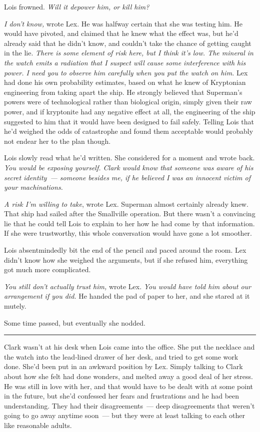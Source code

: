 \documentclass[ebook,12pt]{memoir}
\begin{document}
Lois frowned. \emph{Will it depower him, or kill him?}

\emph{I don't know,} wrote Lex. He was halfway certain that she was
testing him. He would have pivoted, and claimed that he knew what the
effect was, but he'd already said that he didn't know, and couldn't take
the chance of getting caught in the lie. \emph{There is some element of
risk here, but I think it's low. The mineral in the watch emits a
radiation that I suspect will cause some interference with his power. I
need you to observe him carefully when you put the watch on him.} Lex
had done his own probability estimates, based on what he knew of
Kryptonian engineering from taking apart the ship. He strongly believed
that Superman's powers were of technological rather than biological
origin, simply given their raw power, and if kryptonite had any negative
effect at all, the engineering of the ship suggested to him that it
would have been designed to fail safely. Telling Lois that he'd weighed
the odds of catastrophe and found them acceptable would probably not
endear her to the plan though.

Lois slowly read what he'd written. She considered for a moment and
wrote back. \emph{You would be exposing yourself. Clark would know that
someone was aware of his secret identity~--- someone besides me, if he
believed I was an innocent victim of your machinations.}

\emph{A risk I'm willing to take}, wrote Lex. Superman almost certainly
already knew. That ship had sailed after the Smallville operation. But
there wasn't a convincing lie that he could tell Lois to explain to her
how he had come by that information. If she were trustworthy, this whole
conversation would have gone a lot smoother.

Lois absentmindedly bit the end of the pencil and paced around the room.
Lex didn't know how she weighed the arguments, but if she refused him,
everything got much more complicated.

\emph{You still don't actually trust him,} wrote Lex. \emph{You would
have told him about our arrangement if you did.} He handed the pad of
paper to her, and she stared at it mutely.

Some time passed, but eventually she nodded.

\begin{center}\rule{0.5\linewidth}{\linethickness}\end{center}

Clark wasn't at his desk when Lois came into the office. She put the
necklace and the watch into the lead‐lined drawer of her desk, and tried
to get some work done. She'd been put in an awkward position by Lex.
Simply talking to Clark about how she felt had done wonders, and melted
away a good deal of her stress. He was still in love with her, and that
would have to be dealt with at some point in the future, but she'd
confessed her fears and frustrations and he had been understanding. They
had their disagreements~--- deep disagreements that weren't going to go
away anytime soon~--- but they were at least talking to each other like
reasonable adults.
\end{document}
